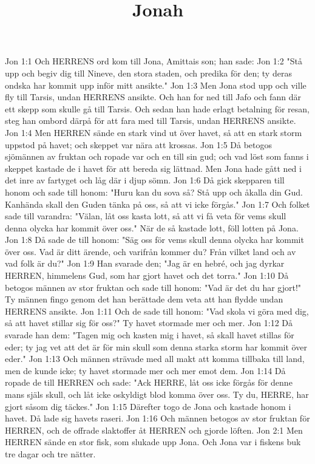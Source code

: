 

\title{Jonah}

Jon 1:1  Och HERRENS ord kom till Jona, Amittais son; han sade:
Jon 1:2  "Stå upp och begiv dig till Nineve, den stora staden, och predika för den; ty deras ondska har kommit upp inför mitt ansikte."
Jon 1:3  Men Jona stod upp och ville fly till Tarsis, undan HERRENS ansikte. Och han for ned till Jafo och fann där ett skepp som skulle gå till Tarsis. Och sedan han hade erlagt betalning för resan, steg han ombord därpå för att fara med till Tarsis, undan HERRENS ansikte.
Jon 1:4  Men HERREN sände en stark vind ut över havet, så att en stark storm uppstod på havet; och skeppet var nära att krossas.
Jon 1:5  Då betogos sjömännen av fruktan och ropade var och en till sin gud; och vad löst som fanns i skeppet kastade de i havet för att bereda sig lättnad. Men Jona hade gått ned i det inre av fartyget och låg där i djup sömn.
Jon 1:6  Då gick skepparen till honom och sade till honom: "Huru kan du sova så? Stå upp och åkalla din Gud. Kanhända skall den Guden tänka på oss, så att vi icke förgås."
Jon 1:7  Och folket sade till varandra: "Välan, låt oss kasta lott, så att vi få veta för vems skull denna olycka har kommit över oss." När de så kastade lott, föll lotten på Jona.
Jon 1:8  Då sade de till honom: "Säg oss för vems skull denna olycka har kommit över oss. Vad är ditt ärende, och varifrån kommer du? Från vilket land och av vad folk är du?"
Jon 1:9  Han svarade den; "Jag är en hebré, och jag dyrkar HERREN, himmelens Gud, som har gjort havet och det torra."
Jon 1:10  Då betogos männen av stor fruktan och sade till honom: "Vad är det du har gjort!" Ty männen fingo genom det han berättade dem veta att han flydde undan HERRENS ansikte.
Jon 1:11  Och de sade till honom: "Vad skola vi göra med dig, så att havet stillar sig för oss?" Ty havet stormade mer och mer.
Jon 1:12  Då svarade han dem: "Tagen mig och kasten mig i havet, så skall havet stillas för eder; ty jag vet att det är för min skull som denna starka storm har kommit över eder."
Jon 1:13  Och männen strävade med all makt att komma tillbaka till land, men de kunde icke; ty havet stormade mer och mer emot dem.
Jon 1:14  Då ropade de till HERREN och sade: "Ack HERRE, låt oss icke förgås för denne mans själs skull, och låt icke oskyldigt blod komma över oss. Ty du, HERRE, har gjort såsom dig täckes."
Jon 1:15  Därefter togo de Jona och kastade honom i havet. Då lade sig havets raseri.
Jon 1:16  Och männen betogos av stor fruktan för HERREN, och de offrade slaktoffer åt HERREN och gjorde löften.
Jon 2:1  Men HERREN sände en stor fisk, som slukade upp Jona. Och Jona var i fiskens buk tre dagar och tre nätter.
